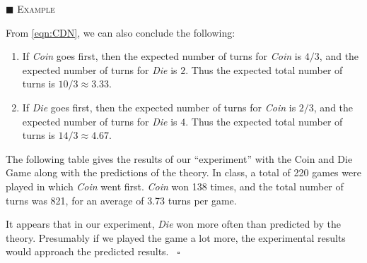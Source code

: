 \documentclass[reqno]{immbook}
\numberwithin{equation}{chapter}
\numberwithin{question}{section}
\numberwithin{theorem}{chapter}
\numberwithin{figure}{chapter}
\theoremstyle{definition}
\newenvironment{xexample}%
{%

\medskip\noindent\addtocounter{example}{1}$\blacksquare$ \textsc{Example \theexample}\hspace*{1em}%
}%
{%
~\hfill$\square$

\medskip
}
\begin{document}
\begin{xexample}
From \eqref{eqn:CDN}, we can also conclude the following:
\begin{enumerate}
\item If \emph{Coin} goes first, then the expected number of
turns for \emph{Coin} is $4/3$, and the expected number of
turns for \emph{Die} is $2$.  Thus the expected total number
of turns is $10/3\approx 3.33$.
\item If \emph{Die} goes first, then the expected number of
turns for \emph{Coin} is $2/3$, and the expected number of
turns for \emph{Die} is $4$.  Thus the expected total number
of turns is $14/3\approx 4.67$.
\end{enumerate}

The following table gives the results of our
``experiment'' with the Coin and Die Game along with
the predictions of the theory.
In class, a total of 220 games were played in which
\emph{Coin} went first.
\emph{Coin} won 138 times, and the total number of
turns was 821, for an average of 3.73 turns per game.

\medskip
\centerline{
}

\medskip
It appears that in our experiment, \emph{Die} won more
often than predicted by the theory.
Presumably if we played the game a lot more, the
experimental results would approach the predicted results.
\end{xexample}
\end{document}

